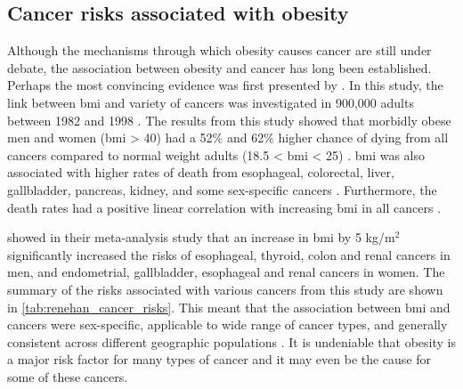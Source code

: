 \subsection{Cancer risks associated with obesity}
\label{sub:cancer_risks_associated_with_obesity}

Although the mechanisms through which obesity causes cancer are still under debate, the association between obesity and cancer has long been established.
Perhaps the most convincing evidence was first presented by \citet{Calle2003}.
In this study, the link between \gls{bmi} and variety of cancers was investigated in 900,000 adults between 1982 and 1998 \citep{Calle2003}.
The results from this study showed that morbidly obese men and women (\gls{bmi} \textgreater{} 40) had a 52\% and 62\% higher chance of dying from all cancers compared to normal weight adults (18.5 \textless{} \gls{bmi} \textless{} 25) \citep{Calle2003}.
\gls{bmi} was also associated with higher rates of death from esophageal, colorectal, liver, gallbladder, pancreas, kidney, and some sex-specific cancers \citep{Calle2003}.
Furthermore, the death rates had a positive linear correlation with increasing \gls{bmi} in all cancers \citep{Calle2003}.

\citet{Renehan2008} showed in their meta-analysis study  that an increase in \gls{bmi} by 5 kg/m$^2$ significantly increased the risks of esophageal, thyroid, colon and renal cancers in men, and endometrial, gallbladder, esophageal and renal cancers in women.
The summary of the risks associated with various cancers from this study are shown in \cref{tab:renehan_cancer_risks}.
This meant that the association between \gls{bmi} and cancers were sex-specific, applicable to wide range of cancer types, and generally consistent across different geographic populations \citep{Renehan2008,Roberts2010}.
It is undeniable that obesity is a major risk factor for many types of cancer and it may even be the cause for some of these cancers.

